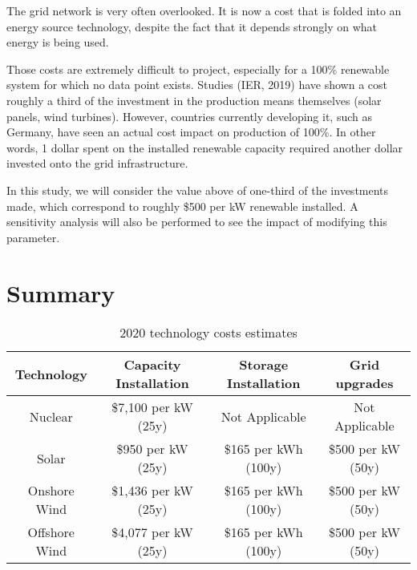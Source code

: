 The grid network is very often overlooked. It is now a cost that is folded into an energy source technology, despite the fact that it depends strongly on what energy is being used.

Those costs are extremely difficult to project, especially for a 100\% renewable system for which no data point exists. Studies (IER, 2019) have shown a cost roughly a third of the investment in the production means themselves (solar panels, wind turbines). However, countries currently developing it, such as Germany, have seen an actual cost impact on production of 100\%. In other words, 1 dollar spent on the installed renewable capacity required another dollar invested onto the grid infrastructure.

In this study, we will consider the value above of one-third of the investments made, which correspond to roughly \$500 per kW renewable installed. A sensitivity analysis will also be performed to see the impact of modifying this parameter.

\section{Summary}

\begin{table*}[ht]
\caption[2020 technology costs estimates]{2020 technology costs estimates}
\begin{tabular}{ c c c c }
	\toprule
	Technology & Capacity Installation & Storage Installation & Grid upgrades \\
	\midrule
	Nuclear & \$7,100 per kW (25y) & Not Applicable & Not Applicable\\
	Solar & \$950 per kW (25y) & \$165 per kWh (100y) & \$500 per kW (50y)\\
	Onshore Wind & \$1,436 per kW (25y) & \$165 per kWh (100y) & \$500 per kW (50y)\\
	Offshore Wind & \$4,077 per kW (25y) & \$165 per kWh (100y) & \$500 per kW (50y)\\
	\bottomrule
\end{tabular}
\end{table*}

